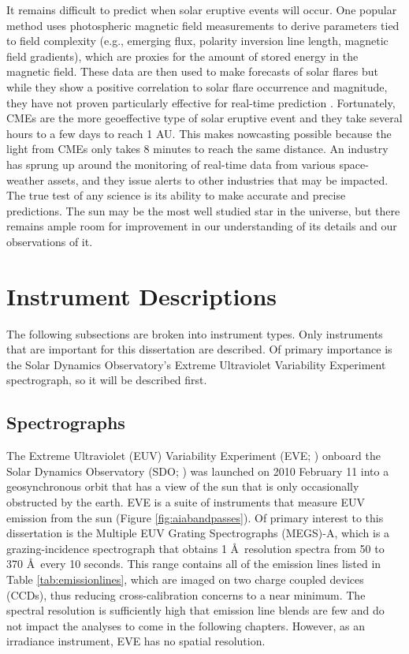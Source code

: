 It remains difficult to predict when solar eruptive events will occur. One popular method uses photospheric magnetic field measurements to derive parameters tied to field complexity (e.g., emerging flux, polarity inversion line length, magnetic field gradients), which are proxies for the amount of stored energy in the magnetic field. These data are then used to make forecasts of solar flares but while they show a positive correlation to solar flare occurrence and magnitude, they have not proven particularly effective for real-time prediction \citep{Mason2010}. Fortunately, CMEs are the more geoeffective type of solar eruptive event and they take several hours to a few days to reach 1 AU. This makes nowcasting possible because the light from CMEs only takes 8 minutes to reach the same distance. An industry has sprung up around the monitoring of real-time data from various space-weather assets, and they issue alerts to other industries that may be impacted. The true test of any science is its ability to make accurate and precise predictions. The sun may be the most well studied star in the universe, but there remains ample room for improvement in our understanding of its details and our observations of it. 

\section{Instrument Descriptions}
\label{sec:instruments}

The following subsections are broken into instrument types. Only instruments that are important for this dissertation are described. Of primary importance is the Solar Dynamics Observatory's Extreme Ultraviolet Variability Experiment spectrograph, so it will be described first. 

\subsection{Spectrographs}
The Extreme Ultraviolet (EUV) Variability Experiment (EVE; \citealt{Woods2012}) onboard the Solar Dynamics Observatory (SDO; \citealt{Pesnell2012}) was launched on 2010 February 11 into a geosynchronous orbit that has a view of the sun that is only occasionally obstructed by the earth. EVE is a suite of instruments that measure EUV emission from the sun (Figure \ref{fig:aiabandpasses}). Of primary interest to this dissertation is the Multiple EUV Grating Spectrographs (MEGS)-A, which is a grazing-incidence spectrograph that obtains 1 \AA\ resolution spectra from 50 to 370 \AA\ every 10 seconds. This range contains all of the emission lines listed in Table \ref{tab:emissionlines}, which are imaged on two charge coupled devices (CCDs), thus reducing cross-calibration concerns to a near minimum. The spectral resolution is sufficiently high that emission line blends are few and do not impact the analyses to come in the following chapters. However, as an irradiance instrument, EVE has no spatial resolution. 

